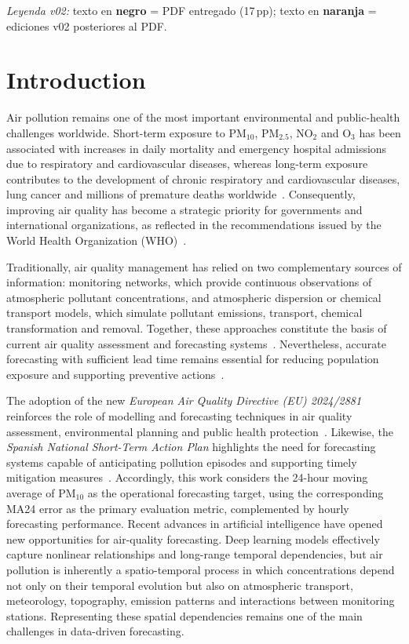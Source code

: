 \documentclass[11pt]{article}
\newcommand{\revnew}[1]{\textcolor{orange!75!black}{#1}}
\begin{document}
\noindent\revnew{\textit{Leyenda v02:} texto en \textbf{negro} = PDF entregado (17\,pp); texto en \textbf{naranja} = ediciones v02 posteriores al PDF.}

\section{Introduction}
\label{sec:introduction}

Air pollution remains one of the most important environmental and public-health challenges worldwide. Short-term exposure to PM$_{10}$, PM$_{2.5}$, NO$_2$ and O$_3$ has been associated with increases in daily mortality and emergency hospital admissions due to respiratory and cardiovascular diseases, whereas long-term exposure contributes to the development of chronic respiratory and cardiovascular diseases, lung cancer and millions of premature deaths worldwide~\cite{Huang2024,EEA,RuizPaez2023}. Consequently, improving air quality has become a strategic priority for governments and international organizations, as reflected in the recommendations issued by the World Health Organization (WHO)~\cite{WHO}.

Traditionally, air quality management has relied on two complementary sources of information: monitoring networks, which provide continuous observations of atmospheric pollutant concentrations, and atmospheric dispersion or chemical transport models, which simulate pollutant emissions, transport, chemical transformation and removal. Together, these approaches constitute the basis of current air quality assessment and forecasting systems~\cite{WHO2023}. Nevertheless, accurate forecasting with sufficient lead time remains essential for reducing population exposure and supporting preventive actions~\cite{Gao2024}.

The adoption of the new \textit{European Air Quality Directive (EU) 2024/2881} reinforces the role of modelling and forecasting techniques in air quality assessment, environmental planning and public health protection~\cite{EUdir}. Likewise, the \textit{Spanish National Short-Term Action Plan} highlights the need for forecasting systems capable of anticipating pollution episodes and supporting timely mitigation measures~\cite{MITECO2021}. Accordingly, this work considers the 24-hour moving average of PM$_{10}$ as the operational forecasting target, using the corresponding MA24 error as the primary evaluation metric, complemented by hourly forecasting performance. Recent advances in artificial intelligence have opened new opportunities for air-quality forecasting. Deep learning models effectively capture nonlinear relationships and long-range temporal dependencies, but air pollution is inherently a spatio-temporal process in which concentrations depend not only on their temporal evolution but also on atmospheric transport, meteorology, topography, emission patterns and interactions between monitoring stations. Representing these spatial dependencies remains one of the main challenges in data-driven forecasting.
\end{document}
